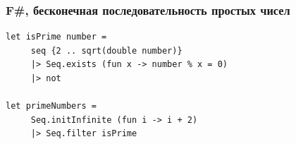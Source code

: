 \documentclass[xetex,mathserif,serif]{beamer}
\begin{document}
	\begin{frame}[fragile]
		\frametitle{F\#, бесконечная последовательность простых чисел}
		\begin{verbatim}
let isPrime number =
     seq {2 .. sqrt(double number)}
     |> Seq.exists (fun x -> number % x = 0) 
     |> not

let primeNumbers =
     Seq.initInfinite (fun i -> i + 2)
     |> Seq.filter isPrime
		\end{verbatim}
	\end{frame}
\end{document}
